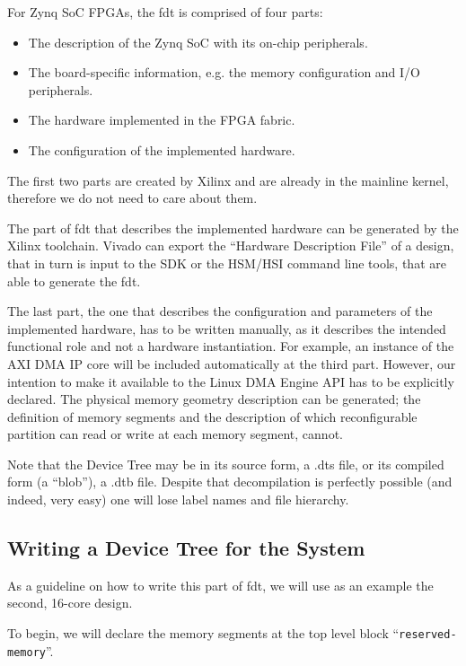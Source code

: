 For Zynq SoC FPGAs, the \gls{fdt} is comprised of four parts:

\begin{itemize}
\item	The description of the Zynq SoC with its on-chip peripherals.
\item	The board-specific information, e.g. the memory configuration and I/O peripherals.
\item	The hardware implemented in the FPGA \gls{fabric}.
\item	The configuration of the implemented hardware.
\end{itemize}

The first two parts are created by Xilinx and are already in the mainline kernel,
therefore we do not need to care about them.

The part of \gls{fdt} that describes the implemented hardware can be generated by the
Xilinx toolchain. Vivado can export the ``Hardware Description File'' of a design,
that in turn is input to the SDK or the HSM/HSI command line tools, that are able
to generate the \gls{fdt}.

The last part, the one that describes the configuration and parameters of the implemented hardware,
has to be written manually, as it describes the intended functional role and not a hardware instantiation.
For example, an instance of the AXI DMA IP core will be included automatically at the third part.
However, our intention to make it available to the Linux DMA Engine API has to be explicitly declared.
The physical memory geometry description can be generated;
the definition of memory segments and the description of which reconfigurable partition
can read or write at each memory segment, cannot.

Note that the Device Tree may be in its source form,
a .dts file, or its compiled form (a ``blob''), a .dtb file.
Despite that decompilation is perfectly possible (and indeed, very easy)
one will lose label names and file hierarchy.

\subsection{Writing a Device Tree for the System}
\label{sec:dt}

As a guideline on how to write this part of \gls{fdt}, 
we will use as an example the second, 16-core design.

To begin, we will declare the memory segments at the top level block ``\texttt{reserved-memory}''.

